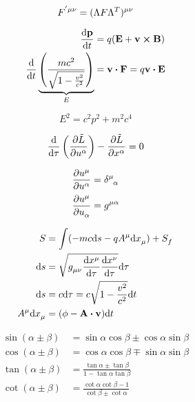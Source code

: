 \documentclass[11pt,twoside]{article}
\begin{document}
\begin{multicols}{3}
\begin{footnotesize}
\begin{equation}
F\indices{^{'\mu\nu}} = (\Lambda F \Lambda^T)\indices{^{\mu\nu}}
\end{equation}

\begin{equation}
\begin{split}
\dv{\vb{p}}{t}&=q(\vb{E}+\vb{v}\cross\vb{B})\\
\dv{t}\underbrace{\left(\frac{mc^2}{\sqrt{1-\frac{v^2}{c^2}}} \right)}_{E} &= \vb{v}\vdot\vb{F} = q\vb{v}\vdot\vb{E}
\end{split}
\end{equation}

\begin{equation}
E^2 = c^2p^2+m^2c^4
\end{equation}

\begin{equation}
\dv{\tau}\left(\pdv{\tilde{L}}{u\indices{^\alpha}} \right) - \pdv{\tilde{L}}{x\indices{^\alpha}} = 0
\end{equation}

\begin{equation}
\begin{split}
\pdv{u\indices{^\mu}}{u\indices{^\alpha}}&=\delta\indices{^\mu_\alpha} \\
\pdv{u\indices{^\mu}}{u\indices{_\alpha}}&=g\indices{^{\mu\alpha}}
\end{split}
\end{equation}

\begin{equation}
\begin{split}
S &= \int (-mc\dd s - qA\indices{^\mu}\dd x\indices{_\mu}) + S\indices{_f} \\
\dd s &= \sqrt{g\indices{_{\mu\nu}}\dv{x\indices{^\mu}}{\tau}\dv{x\indices{^\nu}}{\tau}} \dd \tau \\
\dd s &= c \dd \tau = c \sqrt{1-\frac{v^2}{c^2}}\dd t \\
A\indices{^\mu}\dd x\indices{_\mu} &= (\phi - \vb{A}\vdot\vb{v})\dd t
\end{split}
\end{equation}


\begin{equation}
\begin{split}
\sin(\alpha\pm\beta)&=\sin\alpha\cos\beta\pm\cos\alpha\sin\beta \\
\cos(\alpha\pm\beta)&=\cos\alpha\cos\beta\mp\sin\alpha\sin\beta \\
\tan(\alpha\pm\beta)&=\frac{\tan\alpha\pm\tan\beta}{1-\tan\alpha\tan\beta} \\
\cot(\alpha\pm\beta)&=\frac{\cot\alpha\cot\beta-1}{\cot\beta\pm\cot\alpha}
\end{split}
\end{equation}


\end{footnotesize}
\end{multicols}
\end{document}
